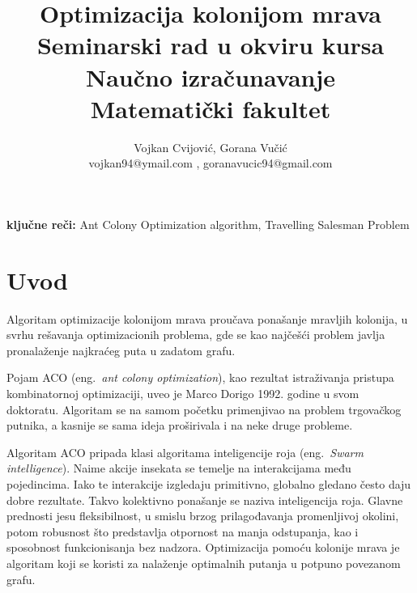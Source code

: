 \documentclass[a4paper]{article}
\providecommand{\keywords}[1]{\textbf{ključne reči:} #1}
\begin{document}
\title{Optimizacija kolonijom mrava\\ 
\hfill \break
\small{Seminarski rad u okviru kursa\\Naučno izračunavanje\\ Matematički fakultet}}

\author{Vojkan Cvijović, Gorana Vučić\\ vojkan94@ymail.com , goranavucic94@gmail.com}


\maketitle


\hfill \break

\keywords{
	Ant Colony Optimization algorithm, Travelling Salesman Problem
}

\tableofcontents

\newpage

\section{Uvod}
\label{sec:uvod}

Algoritam optimizacije kolonijom mrava proučava ponašanje mravljih kolonija, u svrhu rešavanja optimizacionih
problema, gde se kao najčešći problem javlja pronalaženje najkraćeg puta u zadatom grafu.

\vspace{3mm}

Pojam ACO (eng.~{\em ant colony optimization}), kao rezultat istraživanja pristupa kombinatornoj optimizaciji, uveo je Marco Dorigo 1992. godine u svom doktoratu. Algoritam se na samom početku primenjivao na problem trgovačkog putnika, a kasnije se sama ideja proširivala i na neke druge probleme.

\vspace{3mm}

Algoritam ACO pripada klasi algoritama inteligencije roja (eng.~{\em Swarm intelligence}). Naime akcije insekata se temelje na interakcijama među pojedincima. Iako te interakcije izgledaju primitivno, globalno gledano često daju dobre rezultate. Takvo kolektivno ponašanje se naziva inteligencija roja. Glavne prednosti jesu fleksibilnost, u smislu brzog prilagođavanja promenljivoj okolini, potom robusnost što predstavlja otpornost na manja odstupanja, kao i sposobnost funkcionisanja bez nadzora. Optimizacija pomoću kolonije mrava je algoritam koji se koristi za nalaženje optimalnih putanja u potpuno povezanom grafu.
\end{document}
